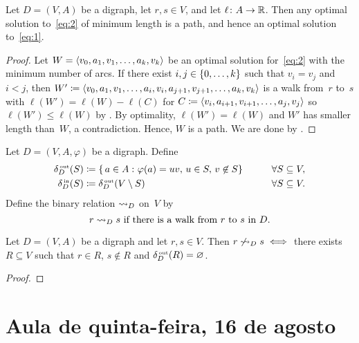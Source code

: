 \documentclass[10pt,reqno]{amsart}
\begin{document}
\begin{proposition}
  \label{prop:1}
  Let \(D = (V,A)\) be a digraph, let \(r,s \in V\), and let
  \(\ell \colon A \to \Reals\).  Then any optimal solution
  to~\eqref{eq:2} of minimum length is a path, and hence an optimal
  solution to~\eqref{eq:1}.
\end{proposition}
\begin{proof}
  Let \(W = \seq{v_0,a_1,v_1,\dotsc,a_k,v_k}\) be an optimal solution
  for~\eqref{eq:2} with the minimum number of arcs.  If there exist
  \(i,j \in \set{0,\dotsc,k}\) such that \(v_i = v_j\) and \(i < j\),
  then
  \(W' \coloneqq
  \seq{v_0,a_1,v_1,\dotsc,a_i,v_i,a_{j+1},v_{j+1},\dotsc,a_k,v_k}\) is
  a walk from~\(r\) to~\(s\) with \(\ell(W') = \ell(W) - \ell(C)\) for
  \(C \coloneqq \seq{v_i,a_{i+1},v_{i+1},\dotsc,a_j,v_j}\) so
  \(\ell(W') \leq \ell(W)\) by .  By optimality,
  \(\ell(W') = \ell(W)\) and \(W'\) has smaller length than~\(W\), a
  contradiction.  Hence, \(W\) is a path.  We are done by .
\end{proof}

Let \(D = (V,A,\varphi)\) be a digraph.  Define
\begin{alignat*}{2}
  \label{eq:4}
  \deltaout[D](S)
  & \coloneqq
  \setst{
    a \in A
  }{
    \varphi(a) = uv,\,
    u \in S,\,
    v \not\in S
  }
  & \qquad &
  \forall S \subseteq V,
  \\
  \deltain[D](S)
  & \coloneqq
  \deltaout[D](V \setminus S)
  & \qquad &
  \forall S \subseteq V.
\end{alignat*}
Define the binary relation \(\reaches_D\) on~\(V\) by
\begin{equation*}
  r \reaches_D s
  \text{ if there is a walk from~\(r\) to~\(s\) in~\(D\)}.
\end{equation*}

\begin{theorem}
  Let \(D = (V,A)\) be a digraph and let \(r,s \in V\).  Then
  \(r \not\reaches_D s \iff\) there exists \(R \subseteq V\) such that
  \(r \in R\), \(s \not\in R\) and \(\deltaout[D](R) = \emptyset\).
\end{theorem}
\begin{proof}
  
\end{proof}

\section{Aula de quinta-feira, 16 de agosto}
\end{document}
